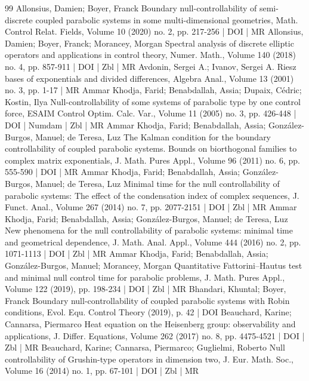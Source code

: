\documentclass[10pt]{amsart}
\theoremstyle{definition}\newtheorem{defi}[theo]{Definition}\newtheorem{rema}[theo]{Remark}\newtheorem{exam}[theo]{Example}\newtheorem{exem}[theo]{Example}\newtheorem{nota}[theo]{Notation}
\begin{document}
\begin{thebibliography}{99}
Allonsius, Damien; Boyer, Franck Boundary null-controllability of semi-discrete coupled parabolic systems in some multi-dimensional geometries, Math. Control Relat. Fields, Volume 10 (2020) no. 2, pp. 217-256 | DOI | MR
Allonsius, Damien; Boyer, Franck; Morancey, Morgan Spectral analysis of discrete elliptic operators and applications in control theory, Numer. Math., Volume 140 (2018) no. 4, pp. 857-911 | DOI | Zbl | MR
Avdonin, Sergei A.; Ivanov, Sergei A. Riesz bases of exponentials and divided differences, Algebra Anal., Volume 13 (2001) no. 3, pp. 1-17 | MR
Ammar Khodja, Farid; Benabdallah, Assia; Dupaix, Cédric; Kostin, Ilya Null-controllability of some systems of parabolic type by one control force, ESAIM Control Optim. Calc. Var., Volume 11 (2005) no. 3, pp. 426-448 | DOI | Numdam | Zbl | MR
Ammar Khodja, Farid; Benabdallah, Assia; González-Burgos, Manuel; de Teresa, Luz The Kalman condition for the boundary controllability of coupled parabolic systems. Bounds on biorthogonal families to complex matrix exponentials, J. Math. Pures Appl., Volume 96 (2011) no. 6, pp. 555-590 | DOI | MR
Ammar Khodja, Farid; Benabdallah, Assia; González-Burgos, Manuel; de Teresa, Luz Minimal time for the null controllability of parabolic systems: The effect of the condensation index of complex sequences, J. Funct. Anal., Volume 267 (2014) no. 7, pp. 2077-2151 | DOI | Zbl | MR
Ammar Khodja, Farid; Benabdallah, Assia; González-Burgos, Manuel; de Teresa, Luz New phenomena for the null controllability of parabolic systems: minimal time and geometrical dependence, J. Math. Anal. Appl., Volume 444 (2016) no. 2, pp. 1071-1113 | DOI | Zbl | MR
Ammar Khodja, Farid; Benabdallah, Assia; González-Burgos, Manuel; Morancey, Morgan Quantitative Fattorini–Hautus test and minimal null control time for parabolic problems, J. Math. Pures Appl., Volume 122 (2019), pp. 198-234 | DOI | Zbl | MR
Bhandari, Khuntal; Boyer, Franck Boundary null-controllability of coupled parabolic systems with Robin conditions, Evol. Equ. Control Theory (2019), p. 42 | DOI
Beauchard, Karine; Cannarsa, Piermarco Heat equation on the Heisenberg group: observability and applications, J. Differ. Equations, Volume 262 (2017) no. 8, pp. 4475-4521 | DOI | Zbl | MR
Beauchard, Karine; Cannarsa, Piermarco; Guglielmi, Roberto Null controllability of Grushin-type operators in dimension two, J. Eur. Math. Soc., Volume 16 (2014) no. 1, pp. 67-101 | DOI | Zbl | MR

\end{thebibliography}
\end{document}
